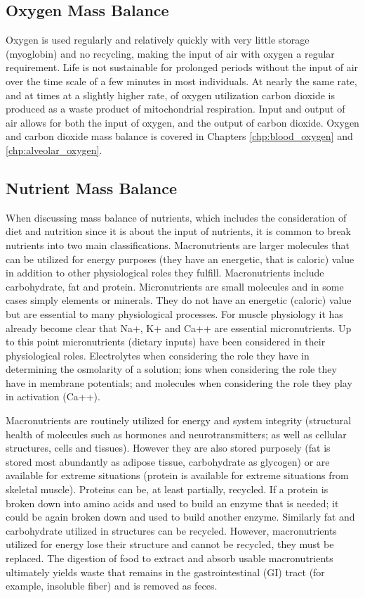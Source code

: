 \subsection{Oxygen Mass Balance}
Oxygen is used regularly and relatively quickly with very little storage (myoglobin) and no recycling, making the input of air with oxygen a regular requirement. Life is not sustainable for prolonged periods without the input of air over the time scale of a few minutes in most individuals. At nearly the same rate, and at times at a slightly higher rate, of oxygen utilization carbon dioxide is produced as a waste product of mitochondrial respiration. Input and output of air allows for both the input of oxygen, and the output of carbon dioxide. Oxygen and carbon dioxide mass balance is covered in Chapters \ref{chp:blood_oxygen} and \ref{chp:alveolar_oxygen}.

\subsection{Nutrient Mass Balance}

When discussing mass balance of nutrients, which includes the consideration of diet and nutrition since it is about the input of nutrients, it is common to break nutrients into two main classifications. Macronutrients are larger molecules that can be utilized for energy purposes (they have an energetic, that is caloric) value in addition to other physiological roles they fulfill. Macronutrients include carbohydrate, fat and protein. Micronutrients are small molecules and in some cases simply elements or minerals. They do not have an energetic (caloric) value but are essential to many physiological processes. For muscle physiology it has already become clear that Na+, K+ and Ca++ are essential micronutrients. Up to this point micronutrients (dietary inputs) have been considered in their physiological roles. Electrolytes when considering the role they have in determining the osmolarity of a solution; ions when considering the role they have in membrane potentials; and molecules when considering the role they play in activation (Ca++).

Macronutrients are routinely utilized for energy and system integrity (structural health of molecules such as hormones and neurotransmitters; as well as cellular structures, cells and tissues). However they are also stored purposely (fat is stored most abundantly as adipose tissue, carbohydrate as glycogen) or are available for extreme situations (protein is available for extreme situations from skeletal muscle). Proteins can be, at least partially, recycled. If a protein is broken down into amino acids and used to build an enzyme that is needed; it could be again broken down and used to build another enzyme. Similarly fat and carbohydrate utilized in structures can be recycled. However, macronutrients utilized for energy lose their structure and cannot be recycled, they must be replaced. The digestion of food to extract and absorb usable macronutrients\footnotemark{} ultimately yields waste that remains in the gastrointestinal (GI) tract (for example, insoluble fiber) and is removed as feces. 

